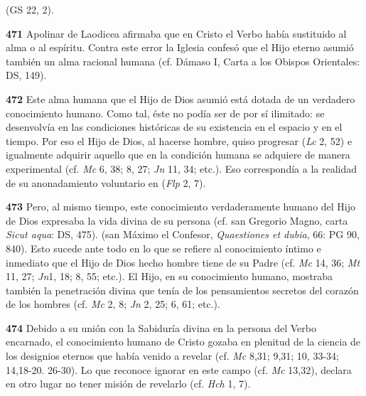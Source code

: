 \begin{body}
\begin{body}
 (GS 22, 2).

\textbf{471} Apolinar de Laodicea afirmaba que en Cristo el Verbo había sustituido al alma o al espíritu. Contra este error la Iglesia confesó que el Hijo eterno asumió también un alma racional humana (cf. Dámaso I, Carta a los Obispos Orientales: DS, 149).

\textbf{472} Este alma humana que el Hijo de Dios asumió está dotada de un verdadero conocimiento humano. Como tal, éste no podía ser de por sí ilimitado: se desenvolvía en las condiciones históricas de su existencia en el espacio y en el tiempo. Por eso el Hijo de Dios, al hacerse hombre, quiso progresar  (\emph{Lc} 2, 52) e igualmente adquirir aquello que en la condición humana se adquiere de manera experimental (cf. \emph{Mc} 6, 38; 8, 27; \emph{Jn} 11, 34; etc.). Eso correspondía a la realidad de su anonadamiento voluntario en  (\emph{Flp} 2, 7).

\textbf{473} Pero, al mismo tiempo, este conocimiento verdaderamente humano del Hijo de Dios expresaba la vida divina de su persona (cf. san Gregorio Magno, carta \emph{Sicut aqua}: DS, 475).  (san Máximo el Confesor, \emph{Quaestiones et dubia}, 66: PG 90, 840). Esto sucede ante todo en lo que se refiere al conocimiento íntimo e inmediato que el Hijo de Dios hecho hombre tiene de su Padre (cf. \emph{Mc} 14, 36; \emph{Mt} 11, 27; \emph{Jn}1, 18; 8, 55; etc.). El Hijo, en su conocimiento humano, mostraba también la penetración divina que tenía de los pensamientos secretos del corazón de los hombres (cf. \emph{Mc} 2, 8; \emph{Jn} 2, 25; 6, 61; etc.).

\textbf{474} Debido a su unión con la Sabiduría divina en la persona del Verbo encarnado, el conocimiento humano de Cristo gozaba en plenitud de la ciencia de los designios eternos que había venido a revelar (cf. \emph{Mc} 8,31; 9,31; 10, 33-34; 14,18-20. 26-30). Lo que reconoce ignorar en este campo (cf. \emph{Mc} 13,32), declara en otro lugar no tener misión de revelarlo (cf. \emph{Hch} 1, 7).


\end{body}
\end{body}
